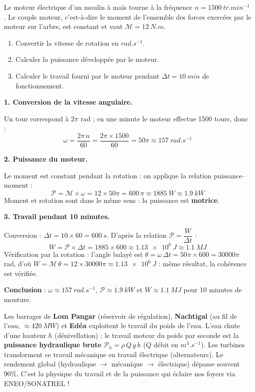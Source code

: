\documentclass[11pt]{article}
\begin{document}
\begin{exoresolu}
Le moteur électrique d'un moulin à maïs tourne à la fréquence $n = \SI{1500}{tr.min^{-1}}$. Le couple moteur, c'est-à-dire le moment de l'ensemble des forces exercées par le moteur sur l'arbre, est constant et vaut $\mathcal{M} = \SI{12}{N.m}$.
\begin{enumerate}
\item Convertir la vitesse de rotation en $\si{rad.s^{-1}}$.
\item Calculer la puissance développée par le moteur.
\item Calculer le travail fourni par le moteur pendant $\Delta t = \SI{10}{min}$ de fonctionnement.
\end{enumerate}
\tcblower
\textbf{1. Conversion de la vitesse angulaire.}

Un tour correspond à $2\pi$ rad ; en une minute le moteur effectue 1500 tours, donc :
\[ \omega = \dfrac{2\pi\,n}{60} = \dfrac{2\pi \times 1500}{60} = 50\pi \approx \SI{157}{rad.s^{-1}} \]

\textbf{2. Puissance du moteur.}

Le moment est constant pendant la rotation : on applique la relation puissance--moment :
\[ \mathcal{P} = \mathcal{M} \times \omega = 12 \times 50\pi = 600\,\pi \approx \SI{1885}{W} \approx \SI{1.9}{kW} \]
Moment et rotation sont dans le même sens : la puissance est \textbf{motrice}.

\textbf{3. Travail pendant 10 minutes.}

Conversion : $\Delta t = 10 \times 60 = \SI{600}{s}$. D'après la relation $\mathcal{P} = \dfrac{W}{\Delta t}$ :
\[ W = \mathcal{P} \times \Delta t = 1885 \times 600 \approx \SI{1.13e6}{J} \approx \SI{1.1}{MJ} \]
Vérification par la rotation : l'angle balayé est $\theta = \omega\,\Delta t = 50\pi \times 600 = 30000\pi$ rad, d'où $W = \mathcal{M}\,\theta = 12 \times 30000\pi \approx \SI{1.13e6}{J}$ : même résultat, la cohérence est vérifiée.

\textbf{Conclusion} : $\omega \approx \SI{157}{rad.s^{-1}}$, $\mathcal{P} \approx \SI{1.9}{kW}$ et $W \approx \SI{1.1}{MJ}$ pour 10 minutes de mouture.
\end{exoresolu}

\begin{savaistu}
Les barrages de \textbf{Lom Pangar} (réservoir de régulation), \textbf{Nachtigal} (au fil de l'eau, $\approx \SI{420}{MW}$) et \textbf{Edéa} exploitent le travail du poids de l'eau. L'eau chute d'une hauteur $h$ (dénivellation) : le travail moteur du poids par seconde est la \textbf{puissance hydraulique brute} $\mathcal{P}_h = \rho\,Q\,g\,h$ ($Q$ débit en $\si{m^3.s^{-1}}$). Les turbines transforment ce travail mécanique en travail électrique (alternateurs). Le rendement global (hydraulique $\to$ mécanique $\to$ électrique) dépasse souvent $90\%$. C'est la physique du travail et de la puissance qui éclaire nos foyers via ENEO/SONATREL !
\end{savaistu}
\end{document}
